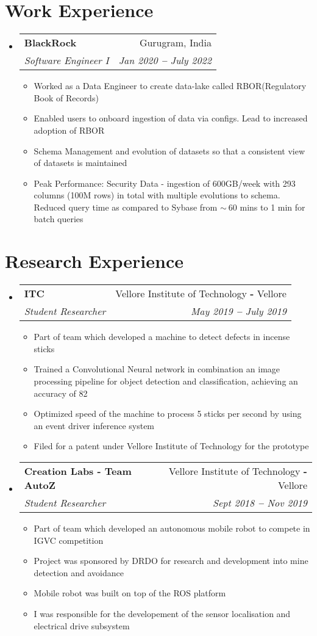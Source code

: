 \documentclass{article}
\makeatletter
\newcommand{\resumeItem}[1]{
  \item\small{
    {#1 \vspace{-2pt}}
  }
}
\newcommand{\resumeSubheading}[4]{
  \vspace{-1pt}\item
    \begin{tabular*}{0.97\textwidth}[t]{l@{\extracolsep{\fill}}r}
      \textbf{#1} & #2 \\
      \textit{\small#3} & \textit{\small #4} \\
    \end{tabular*}\vspace{-7pt}
}
\newcommand{\resumeSubHeadingListStart}{\begin{itemize}[leftmargin=0.15in, label={}]}
\newcommand{\resumeSubHeadingListEnd}{\end{itemize}}
\newcommand{\resumeItemListStart}{\begin{itemize}}
\newcommand{\resumeItemListEnd}{\end{itemize}\vspace{-6pt}}
\makeatother
\begin{document}
\section{Work Experience}
  \vspace{1pt}
  \resumeSubHeadingListStart
    \resumeSubheading
      {BlackRock}{Gurugram, India}
      {Software Engineer I}{Jan 2020 \textbf{--} July 2022}
        \resumeItemListStart
            \resumeItem{Worked as a Data Engineer to create data-lake called RBOR(Regulatory Book of Records) }
            \resumeItem{Enabled users to onboard ingestion of data via configs. Lead to increased adoption of RBOR}
            \resumeItem{Schema Management and evolution of datasets so that a consistent view of datasets is maintained}
            \resumeItem{Peak Performance: Security Data - ingestion of 600GB/week with 293 columns (100M rows) in total with multiple evolutions to schema. Reduced query time as compared to Sybase from $\sim{~}$60 mins to 1 min for batch queries}  
          \resumeItemListEnd 
  \resumeSubHeadingListEnd


\section{Research Experience}
  \resumeSubHeadingListStart
    \resumeSubheading
      {ITC}{ Vellore Institute of Technology  \textbf{-} Vellore}
      {Student Researcher}{May 2019 \textbf{--}  July 2019}
        \resumeItemListStart
            \resumeItem{Part of team which developed a machine to detect defects in incense sticks}
            \resumeItem{Trained a Convolutional Neural network in combination an image processing pipeline for object detection and classification, achieving an accuracy of 82\symbol{\%} }
            \resumeItem{Optimized speed of the machine to process 5 sticks per second by using an event driver inference system}
            \resumeItem{Filed for a patent under Vellore Institute of Technology for the prototype}
            \resumeItemListEnd
    \resumeSubheading
      {Creation Labs - Team AutoZ}{Vellore Institute of Technology \textbf{-} Vellore}
      {Student Researcher}{Sept 2018 \textbf{--}  Nov 2019}
        \resumeItemListStart
            \resumeItem{Part of team which developed an autonomous mobile robot to compete in IGVC competition}
            \resumeItem{Project was sponsored by DRDO for research and development into mine detection and avoidance}
            \resumeItem{Mobile robot was built on top of the ROS platform}
            \resumeItem{I was responsible for the developement of the sensor localisation and electrical drive subsystem}
          \resumeItemListEnd
  \resumeSubHeadingListEnd
\end{document}
